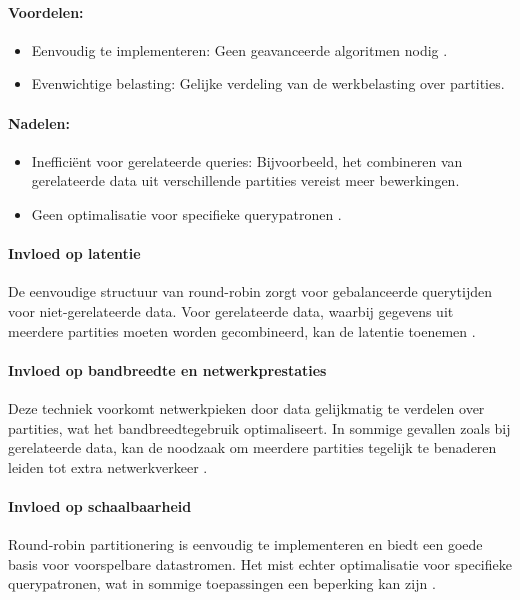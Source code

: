 \paragraph{Voordelen:}
\begin{itemize}
    \item Eenvoudig te implementeren: Geen geavanceerde algoritmen nodig \autocite{Mahmud2020}.
    \item Evenwichtige belasting: Gelijke verdeling van de werkbelasting over partities.
\end{itemize}
 
\paragraph{Nadelen:}
\begin{itemize}
    \item Inefficiënt voor gerelateerde queries: Bijvoorbeeld, het combineren van gerelateerde data uit verschillende partities vereist meer bewerkingen.
    \item Geen optimalisatie voor specifieke querypatronen \autocite{Ponnusamy2024}.
\end{itemize}
 
\paragraph{Invloed op latentie} 
De eenvoudige structuur van round-robin zorgt voor gebalanceerde querytijden voor niet-gerelateerde data. Voor gerelateerde data, waarbij gegevens uit meerdere partities moeten worden gecombineerd, kan de latentie toenemen \autocite{Mahmud2020}.
 
\paragraph{Invloed op bandbreedte en netwerkprestaties} 
Deze techniek voorkomt netwerkpieken door data gelijkmatig te verdelen over partities, wat het bandbreedtegebruik optimaliseert. In sommige gevallen zoals bij gerelateerde data, kan de noodzaak om meerdere partities tegelijk te benaderen leiden tot extra netwerkverkeer \autocite{Mahmud2020}.
 
\paragraph{Invloed op schaalbaarheid} 
Round-robin partitionering is eenvoudig te implementeren en biedt een goede basis voor voorspelbare datastromen. Het mist echter optimalisatie voor specifieke querypatronen, wat in sommige toepassingen een beperking kan zijn \autocite{Mahmud2020, Ponnusamy2024}.
 
